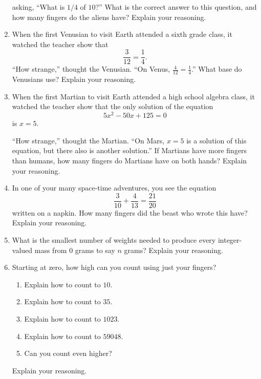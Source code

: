 \begin{problems}
\begin{enumerate}
  asking, ``What is $1/4$ of $10$?'' What is the correct answer to
  this question, and how many fingers do the aliens have? Explain your
  reasoning.
\item When the first Venusian to visit Earth attended a sixth grade
  class, it watched the teacher show that
\[
\frac{3}{12} = \frac{1}{4}.
\]
``How strange,'' thought the Venusian. ``On Venus, $\frac{4}{12} =
\frac{1}{4}$.'' What base do Venusians use? Explain your reasoning.
\item When the first Martian to visit Earth attended a high school
  algebra class, it watched the teacher show that the only solution of
  the equation
\[
5x^2-50x+125 = 0
\]
is $x = 5$.

``How strange,'' thought the Martian. ``On Mars, $x = 5$ is a solution
of this equation, but there also is another solution.'' If Martians
have more fingers than humans, how many fingers do Martians have on both hands?
Explain your reasoning.


\item In one of your many space-time adventures, you see the equation
\[
\frac{3}{10} + \frac{4}{13} = \frac{21}{20}
\]
written on a napkin. How many fingers did the beast who wrote this
have? Explain your reasoning.
\item What is the smallest number of weights needed to produce every
  integer-valued mass from $0$ grams to say $n$ grams? Explain your
  reasoning.
\item Starting at zero, how high can you count using just your
  fingers?
\begin{enumerate}
\item Explain how to count to $10$.
\item Explain how to count to $35$.
\item Explain how to count to $1023$.
\item Explain how to count to $59048$.
\item Can you count even higher?
\end{enumerate}
Explain your reasoning.
\end{enumerate}

\end{problems}








